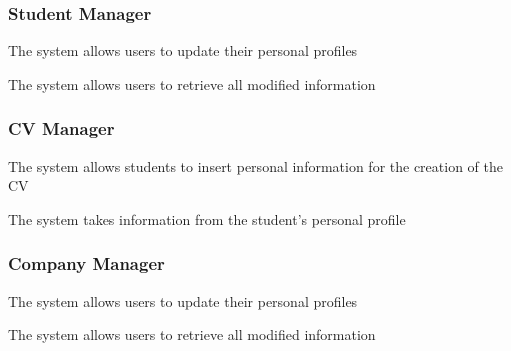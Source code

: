 \subsubsection*{Student Manager}
\begin{enumerate}[label={\textbf{[R\arabic*]}}, leftmargin=1.35cm]
    \setcounter{enumi}{4}
    \item The system allows users to update their personal profiles
    \setcounter{enumi}{6}
    \item The system allows users to retrieve all modified information
\end{enumerate}


\subsubsection*{CV Manager}
\begin{enumerate}[label={\textbf{[R\arabic*]}}, leftmargin=1.35cm]
    \setcounter{enumi}{2}
    \item The system allows students to insert personal information for the creation of the CV
    \setcounter{enumi}{7}
    \item The system takes information from the student's personal profile
\end{enumerate}

\subsubsection*{Company Manager}
\begin{enumerate}[label={\textbf{[R\arabic*]}}, leftmargin=1.35cm]
    \setcounter{enumi}{4}
    \item The system allows users to update their personal profiles
    \setcounter{enumi}{6}
    \item The system allows users to retrieve all modified information
\end{enumerate}

